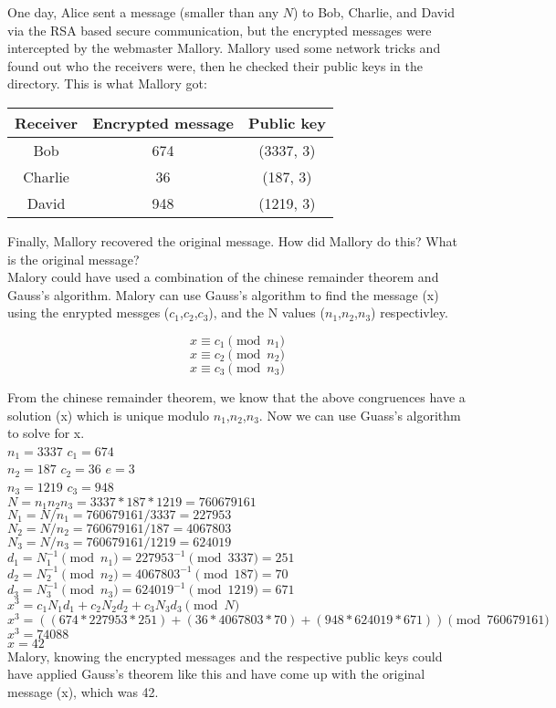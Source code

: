 \documentclass{article}
\begin{document}
\noindent One day, Alice sent a message (smaller than any $N$) to Bob,
Charlie, and David via the RSA based secure communication, but the
encrypted messages were intercepted by the webmaster Mallory. Mallory
used some network tricks and found out who the receivers were, then he
checked their public keys in the directory. This is what Mallory got:

\begin{center}
  \begin{tabular}{ | c | c | c | }
    \hline
    Receiver & Encrypted message & Public key \\ \hline
    Bob & 674 & (3337, 3) \\
    Charlie & 36 & (187, 3) \\
    David & 948 & (1219, 3) \\
    \hline
  \end{tabular}
\end{center}

\noindent Finally, Mallory recovered the original message. How did
Mallory do this? What is the original message?\\

 Malory could have used a combination of
the chinese remainder theorem and Gauss's algorithm. Malory can use Gauss's
algorithm to find the message (x) using the enrypted messges ($c_1$,$c_2$,$c_3$),
and the N values ($n_1$,$n_2$,$n_3$) respectivley.

$$x \equiv c_1 \pmod{n_1}$$
$$x \equiv c_2 \pmod{n_2}$$
$$x \equiv c_3 \pmod{n_3}$$

\noindent From the chinese remainder theorem, we know that the above congruences
have a solution (x) which is unique modulo $n_1$,$n_2$,$n_3$. Now we can use Guass's
algorithm to solve for x.\\

\noindent $n_1 = 3337$ \hspace{1in} $c_1 = 674$\\
$n_2 = 187$ \hspace{1.1in} $c_2 = 36$ \hspace{1in} $e = 3$\\
$n_3 = 1219$ \hspace{1in} $c_3 = 948$\\
$N = n_1n_2n_3 = 3337*187*1219 = 760679161$\\
$N_1 = N/n_1 = 760679161/3337 = 227953$\\
$N_2 = N/n_2 = 760679161/187 = 4067803$\\
$N_3 = N/n_3 = 760679161/1219 = 624019$\\
$d_1 = N_1^{-1} \pmod{n_1} = 227953^{-1} \pmod{3337} = 251$\\
$d_2 = N_2^{-1} \pmod{n_2} = 4067803^{-1} \pmod{187} = 70$\\
$d_3 = N_3^{-1} \pmod{n_3} = 624019^{-1} \pmod{1219} = 671$\\
$x^{3} = c_1N_1d_1 + c_2N_2d_2 + c_3N_3d_3 \pmod {N}$\\
$x^{3} = ((674*227953*251)+(36*4067803*70)+(948*624019*671))\pmod{760679161}$\\
$x^{3} = 74088$\\
$x = 42$\\

\noindent Malory, knowing the encrypted messages and the respective public keys could have
applied Gauss's theorem like this and have come up with the original message (x), which was 42.
\end{document}
